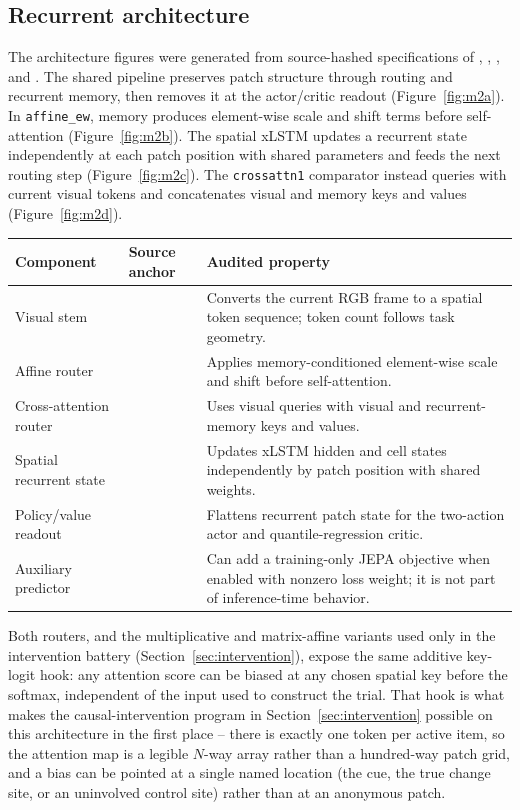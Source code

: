 \documentclass[11pt,a4paper]{article}
\newcommand{\env}[1]{\texttt{#1}}
\begin{document}
\subsection{Recurrent architecture}\label{sec:architecture}
The architecture figures were generated from source-hashed specifications of , , , and . The shared pipeline preserves patch structure through routing and recurrent memory, then removes it at the actor/critic readout (Figure~\ref{fig:m2a}). In \env{affine\_ew}, memory produces element-wise scale and shift terms before self-attention (Figure~\ref{fig:m2b}). The spatial xLSTM updates a recurrent state independently at each patch position with shared parameters and feeds the next routing step (Figure~\ref{fig:m2c}). The \env{crossattn1} comparator instead queries with current visual tokens and concatenates visual and memory keys and values (Figure~\ref{fig:m2d}).

\label{tab:architecture-components}
\begin{tabularx}{\textwidth}{@{}p{2.8cm}p{4.2cm}Y@{}}
\toprule
Component & Source anchor & Audited property\\
\midrule
Visual stem &  & Converts the current RGB frame to a spatial token sequence; token count follows task geometry.\\
Affine router &  & Applies memory-conditioned element-wise scale and shift before self-attention.\\
Cross-attention router &  & Uses visual queries with visual and recurrent-memory keys and values.\\
Spatial recurrent state &  & Updates xLSTM hidden and cell states independently by patch position with shared weights.\\
Policy/value readout &  & Flattens recurrent patch state for the two-action actor and quantile-regression critic.\\
Auxiliary predictor &  & Can add a training-only JEPA objective when enabled with nonzero loss weight; it is not part of inference-time behavior.\\
\bottomrule
\end{tabularx}

Both routers, and the multiplicative and matrix-affine variants used only in the intervention battery (Section~\ref{sec:intervention}), expose the same additive key-logit hook: any attention score can be biased at any chosen spatial key before the softmax, independent of the input used to construct the trial. That hook is what makes the causal-intervention program in Section~\ref{sec:intervention} possible on this architecture in the first place -- there is exactly one token per active item, so the attention map is a legible $N$-way array rather than a hundred-way patch grid, and a bias can be pointed at a single named location (the cue, the true change site, or an uninvolved control site) rather than at an anonymous patch.
\end{document}
